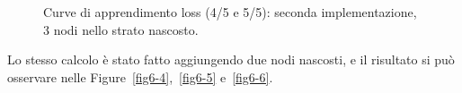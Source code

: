 \documentclass[a4paper,12pt]{article}
\begin{document}
\begin{figure}[htp]
    \centering

    \medskip


    \caption{Curve di apprendimento loss (4/5 e 5/5): seconda implementazione, 3 nodi nello strato nascosto.}
    \label{fig6-3}
\end{figure}



\newpage
Lo stesso calcolo è stato fatto aggiungendo due nodi nascosti, e il risultato si può osservare nelle Figure~\vref{fig6-4},~\vref{fig6-5} e~\vref{fig6-6}.
\end{document}
